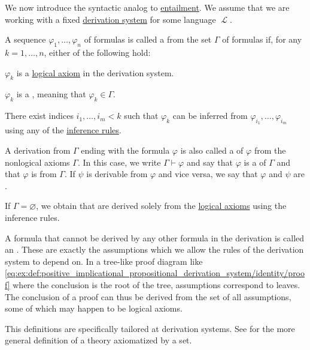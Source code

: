\begin{definition}\label{def:derivation_system_derivability}
  We now introduce the syntactic analog to \hyperref[def:first_order_semantics/entailment]{entailment}. We assume that we are working with a fixed \hyperref[def:proof_derivation_system]{derivation system} for some language \( \mscrL \).

 A sequence \( \varphi_1, \ldots, \varphi_n \) of formulas is called a  from the set \( \Gamma \) of formulas if, for any \( k = 1, \ldots, n \), either of the following hold:
  \begin{thmenum}
     \( \varphi_k \) is a \hyperref[def:proof_derivation_system/axioms]{logical axiom} in the derivation system.

     \( \varphi_k \) is a , meaning that \( \varphi_k \in \Gamma \).

     There exist indices \( i_1, \ldots, i_m < k \) such that \( \varphi_k \) can be inferred from \( \varphi_{i_1}, \ldots, \varphi_{i_m} \) using any of the \hyperref[def:proof_derivation_system/rules]{inference rules}.
  \end{thmenum}

  A derivation from \( \Gamma \) ending with the formula \( \varphi \) is also called a  of \( \varphi \) from the nonlogical axioms \( \Gamma \). In this case, we write \( \Gamma \vdash \varphi \) and say that \( \varphi \) is a  of \( \Gamma \) and that \( \varphi \) is  from \( \Gamma \). If \( \psi \) is derivable from \( \varphi \) and vice versa, we say that \( \varphi \) and \( \psi \) are .

  If \( \Gamma = \varnothing \), we obtain  that are derived solely from the \hyperref[def:proof_derivation_system/axioms]{logical axioms} using the inference rules.

  A formula that cannot be derived by any other formula in the derivation is called an . These are exactly the assumptions which we allow the rules of the derivation system to depend on. In a tree-like proof diagram like \eqref{eq:ex:def:positive_implicational_propositional_derivation_system/identity/proof} where the conclusion is the root of the tree, assumptions correspond to leaves. The conclusion of a proof can thus be derived from the set of all assumptions, some of which may happen to be logical axioms.

  This definitions are specifically tailored at derivation systems. See  for the more general definition of a theory axiomatized by a set.
\end{definition}

